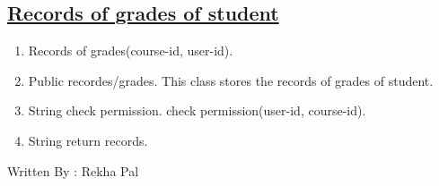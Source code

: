 \documentclass{article}
\begin{document}
\subsection*{\underline{Records of grades of student}}
\begin{enumerate}
\item Records of grades(course-id, user-id).
\item Public recordes/grades.
\* This class stores the records of grades of student.
\item String check permission.
\* check permission(user-id, course-id).
\item String return records.
\end{enumerate} 
Written By : Rekha Pal
\end{document}
